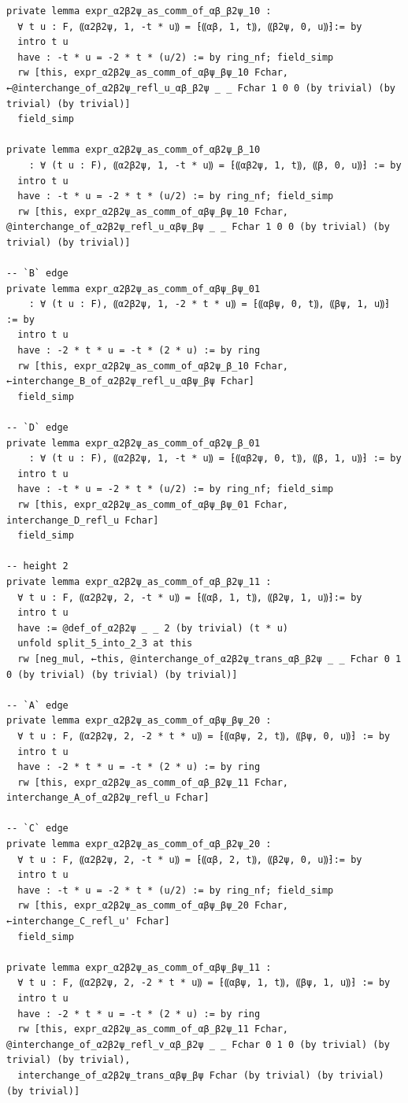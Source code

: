 \begin{Verbatim}
private lemma expr_α2β2ψ_as_comm_of_αβ_β2ψ_10 :
  ∀ t u : F, ⸨α2β2ψ, 1, -t * u⸩ = ⁅⸨αβ, 1, t⸩, ⸨β2ψ, 0, u⸩⁆:= by
  intro t u
  have : -t * u = -2 * t * (u/2) := by ring_nf; field_simp
  rw [this, expr_α2β2ψ_as_comm_of_αβψ_βψ_10 Fchar, ←@interchange_of_α2β2ψ_refl_u_αβ_β2ψ _ _ Fchar 1 0 0 (by trivial) (by trivial) (by trivial)]
  field_simp

private lemma expr_α2β2ψ_as_comm_of_αβ2ψ_β_10
    : ∀ (t u : F), ⸨α2β2ψ, 1, -t * u⸩ = ⁅⸨αβ2ψ, 1, t⸩, ⸨β, 0, u⸩⁆ := by
  intro t u
  have : -t * u = -2 * t * (u/2) := by ring_nf; field_simp
  rw [this, expr_α2β2ψ_as_comm_of_αβψ_βψ_10 Fchar, @interchange_of_α2β2ψ_refl_u_αβψ_βψ _ _ Fchar 1 0 0 (by trivial) (by trivial) (by trivial)]

-- `B` edge
private lemma expr_α2β2ψ_as_comm_of_αβψ_βψ_01
    : ∀ (t u : F), ⸨α2β2ψ, 1, -2 * t * u⸩ = ⁅⸨αβψ, 0, t⸩, ⸨βψ, 1, u⸩⁆ := by
  intro t u
  have : -2 * t * u = -t * (2 * u) := by ring
  rw [this, expr_α2β2ψ_as_comm_of_αβ2ψ_β_10 Fchar, ←interchange_B_of_α2β2ψ_refl_u_αβψ_βψ Fchar]
  field_simp

-- `D` edge
private lemma expr_α2β2ψ_as_comm_of_αβ2ψ_β_01
    : ∀ (t u : F), ⸨α2β2ψ, 1, -t * u⸩ = ⁅⸨αβ2ψ, 0, t⸩, ⸨β, 1, u⸩⁆ := by
  intro t u
  have : -t * u = -2 * t * (u/2) := by ring_nf; field_simp
  rw [this, expr_α2β2ψ_as_comm_of_αβψ_βψ_01 Fchar, interchange_D_refl_u Fchar]
  field_simp

-- height 2
private lemma expr_α2β2ψ_as_comm_of_αβ_β2ψ_11 :
  ∀ t u : F, ⸨α2β2ψ, 2, -t * u⸩ = ⁅⸨αβ, 1, t⸩, ⸨β2ψ, 1, u⸩⁆:= by
  intro t u
  have := @def_of_α2β2ψ _ _ 2 (by trivial) (t * u)
  unfold split_5_into_2_3 at this
  rw [neg_mul, ←this, @interchange_of_α2β2ψ_trans_αβ_β2ψ _ _ Fchar 0 1 0 (by trivial) (by trivial) (by trivial)]

-- `A` edge
private lemma expr_α2β2ψ_as_comm_of_αβψ_βψ_20 :
  ∀ t u : F, ⸨α2β2ψ, 2, -2 * t * u⸩ = ⁅⸨αβψ, 2, t⸩, ⸨βψ, 0, u⸩⁆ := by
  intro t u
  have : -2 * t * u = -t * (2 * u) := by ring
  rw [this, expr_α2β2ψ_as_comm_of_αβ_β2ψ_11 Fchar, interchange_A_of_α2β2ψ_refl_u Fchar]

-- `C` edge
private lemma expr_α2β2ψ_as_comm_of_αβ_β2ψ_20 :
  ∀ t u : F, ⸨α2β2ψ, 2, -t * u⸩ = ⁅⸨αβ, 2, t⸩, ⸨β2ψ, 0, u⸩⁆:= by
  intro t u
  have : -t * u = -2 * t * (u/2) := by ring_nf; field_simp
  rw [this, expr_α2β2ψ_as_comm_of_αβψ_βψ_20 Fchar, ←interchange_C_refl_u' Fchar]
  field_simp

private lemma expr_α2β2ψ_as_comm_of_αβψ_βψ_11 :
  ∀ t u : F, ⸨α2β2ψ, 2, -2 * t * u⸩ = ⁅⸨αβψ, 1, t⸩, ⸨βψ, 1, u⸩⁆ := by
  intro t u
  have : -2 * t * u = -t * (2 * u) := by ring
  rw [this, expr_α2β2ψ_as_comm_of_αβ_β2ψ_11 Fchar, @interchange_of_α2β2ψ_refl_v_αβ_β2ψ _ _ Fchar 0 1 0 (by trivial) (by trivial) (by trivial),
  interchange_of_α2β2ψ_trans_αβψ_βψ Fchar (by trivial) (by trivial) (by trivial)]


\end{Verbatim}
